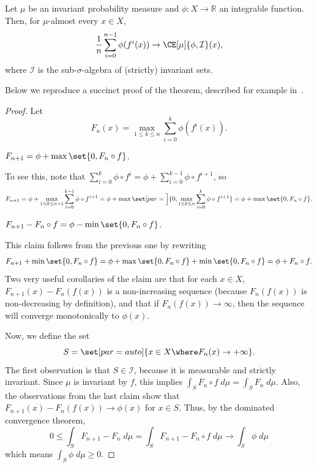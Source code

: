 \documentclass[../main]{subfiles}
\begin{document}
\begin{theorem}\label{thm:birkhoff}
  Let  \(\mu\) be an invariant probability measure and \(\phi \colon X \to \mathbb{R}\) an integrable function. Then, for \(\mu\)-almost every \(x \in X\),
  \begin{equation}\label{eq:birkhoff}
    \frac{1}{n}\sum_{i = 0}^{n - 1} \phi (f^i(x)) \to \CE[\mu]{\phi, \mathcal{I}}(x),
  \end{equation}
  where \(\mathcal{I}\) is the sub-\(\sigma\)-algebra of (strictly) invariant sets.
\end{theorem}

Below we reproduce a succinct proof of the theorem, described for example in~\cite[136]{katokIntroductionModernTheory1995}.

\begin{proof}
  Let
  \[F_n(x)= \max_{1 \le k \le n} \sum_{i = 0}^{k} \phi(f^i(x)).\]

  \begin{claim}
    \(F_{n + 1} = \phi + \max\set{0, F_n \circ f}\).
  \end{claim}
  To see this, note that \(\sum_{i = 0}^{k} \phi \circ f^i = \phi + \sum_{i = 0}^{k - 1} \phi \circ f^{i + 1}\), so
  \[F_{n + 1}
    = \phi + \max_{1 \le k \le n + 1}\sum_{i = 0}^{k - 1} \phi \circ f^{i + 1}
    = \phi + \max\set[par = \Big]{0,\max_{1 \le k \le n}\sum_{i = 0}^{k} \phi \circ f^{i + 1}}
    = \phi + \max \set{0,F_n \circ f}.
  \]

  \begin{claim}
    \(F_{n + 1} - F_n \circ f = \phi - \min\set{0, F_n \circ f}\).
  \end{claim}
  This claim follows from the previous one by rewriting
  \begin{align*}
    F_{n + 1} + \min\set{0, F_n \circ f} = \phi + \max\set{0, F_n \circ f} + \min\set{0, F_n \circ f} = \phi + F_n \circ f.
  \end{align*}
  Two very useful corollaries of the claim are that for each \(x \in X\), \(F_{n + 1}(x) - F_n(f(x))\) is a non-increasing sequence (because \(F_n(f(x))\) is non-decreasing by definition), and that if \(F_n(f(x)) \to \infty\), then the sequence will converge monotonically to \(\phi(x)\).

  Now, we define the set
  \begin{equation*}
    S = \set[par = auto]{x \in X \where F_n(x) \to + \infty}.
  \end{equation*}
  The first observation is that \(S \in \mathcal{I}\), because it is measurable and strictly invariant. Since \(\mu\) is invariant by \(f\), this implies \(\int_S F_n \circ f\;d\mu = \int_S F_n\;d\mu\). Also, the observations from the last claim show that \(F_{n + 1}(x) - F_n(f(x)) \to \phi(x)\) for \(x \in S\). Thus, by the dominated convergence theorem,
  \begin{equation}\label{eq:1}
    0 \le \int_S F_{n + 1} - F_n\;d\mu = \int_S F_{n + 1} - F_n \circ f\;d\mu \to \int_S \phi\;d\mu
  \end{equation}
  which means \(\int_S \phi\;d\mu \ge 0\).


\end{proof}
\end{document}
